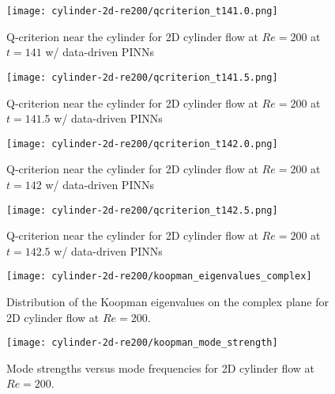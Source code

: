 \begin{figure}[!hbt]
    \centering%
    \texttt{[image: cylinder-2d-re200/qcriterion\_t141.0.png]}%
    \caption{%
        Q-criterion near the cylinder for 2D cylinder flow at $Re=\num{200}$ at $t=141$ w/ data-driven PINNs
    }
    \label{fig:cylinder-re200-pinn-qcrit-t141.0}%
\end{figure}

\begin{figure}[!hbt]
    \centering%
    \texttt{[image: cylinder-2d-re200/qcriterion\_t141.5.png]}%
    \caption{%
        Q-criterion near the cylinder for 2D cylinder flow at $Re=\num{200}$ at $t=141.5$ w/ data-driven PINNs
    }
    \label{fig:cylinder-re200-pinn-qcrit-t141.5}%
\end{figure}

\begin{figure}[!hbt]
    \centering%
    \texttt{[image: cylinder-2d-re200/qcriterion\_t142.0.png]}%
    \caption{%
        Q-criterion near the cylinder for 2D cylinder flow at $Re=\num{200}$ at $t=142$ w/ data-driven PINNs
    }
    \label{fig:cylinder-re200-pinn-qcrit-t142.0}%
\end{figure}

\begin{figure}[!hbt]
    \centering%
    \texttt{[image: cylinder-2d-re200/qcriterion\_t142.5.png]}%
    \caption{%
        Q-criterion near the cylinder for 2D cylinder flow at $Re=\num{200}$ at $t=142.5$ w/ data-driven PINNs
    }
    \label{fig:cylinder-re200-pinn-qcrit-t142.5}%
\end{figure}

\begin{figure}[!hbt]
    \centering%
    \texttt{[image: cylinder-2d-re200/koopman\_eigenvalues\_complex]}%
    \caption{%
        Distribution of the Koopman eigenvalues on the complex plane for 2D cylinder flow at $Re=\num{200}$.
    }
    \label{fig:cylinder-re200-koopman-eig-dist}%
\end{figure}

\begin{figure}[!hbt]
    \centering%
    \texttt{[image: cylinder-2d-re200/koopman\_mode\_strength]}%
    \caption{%
        Mode strengths versus mode frequencies for 2D cylinder flow at $Re=\num{200}$.
    }
    \label{fig:cylinder-re200-koopman-mode-strength}%
\end{figure}

